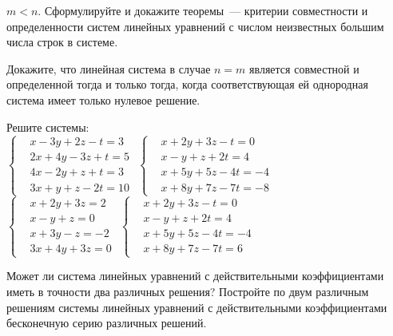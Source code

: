 \begin{problems}
\item
$m < n$.
Сформулируйте и докажите теоремы~--- критерии совместности и определенности
систем линейных уравнений с числом неизвестных большим числа строк в системе.

\item
Докажите, что линейная система в случае $n = m$ является совместной и
определенной тогда и только тогда, когда соответствующая ей однородная система
имеет только нулевое решение.

\item
Решите системы:
\\[1ex]
\sbp
\(\left\{\begin{aligned}
&   x - 3 y + 2 z - t
=
    3
\\
&   2 x + 4 y - 3 z + t
=
    5
\\
&   4 x - 2 y + z + t
=
    3
\\
&   3 x + y + z - 2 t
=
    10
\end{aligned}\right.\)
\qquad
\sbp
\(\left\{\begin{aligned}
&   x + 2 y + 3 z - t
=
    0
\\
&   x - y + z + 2 t
=
    4
\\
&   x + 5 y + 5 z - 4 t
=
    -4
\\
&   x + 8 y + 7 z - 7 t
=
    -8
\end{aligned}\right.\)
\\[1ex]
\sbp
\(\left\{\begin{aligned}
&   x + 2 y + 3 z
=
    2
\\
&   x - y + z
=
    0
\\
&   x + 3 y - z
=
    -2
\\
&   3 x + 4 y + 3 z
=
    0
\end{aligned}\right.\)
\qquad
\sbp
\(\left\{\begin{aligned}
&   x + 2 y + 3 z - t
=
    0
\\
&   x - y + z + 2 t
=
    4
\\
&   x + 5 y + 5 z - 4 t
=
    -4
\\
&   x + 8 y + 7 z - 7 t
=
    6
\end{aligned}\right.\)

\item
Может ли система линейных уравнений с действительными коэффициентами
иметь в точности два различных решения?
Постройте по двум различным решениям системы линейных уравнений с
действительными коэффициентами бесконечную серию различных решений.

\end{problems}

